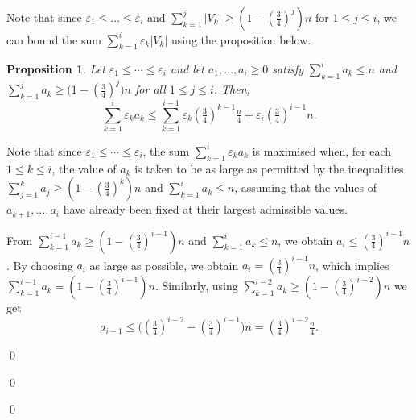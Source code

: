 \documentclass[10pt]{article}
\theoremstyle{plain}
\numberwithin{theorem}{section}
\newtheorem{prop}[theorem]{Proposition}
\theoremstyle{definition}
\theoremstyle{remark}
\renewenvironment{proof}[1][]{\begin{trivlist}
\item[\hspace{\labelsep}{\bf\noindent Proof#1.\/}] }{\qed\end{trivlist}}
\newcommand{\eps}{\varepsilon}
\theoremstyle{plain}
\begin{document}
\begin{proof}[ of \Cref{lem:expandercoverweak}]
\begin{proof}[ of claim]
Note that since $\eps_1 \le \ldots \le \eps_i$ and $\sum_{k = 1}^j |V_k| \ge (1 - \left(\frac{3}{4}\right)^j)n$ for $1 \le j \le i$, we can bound the sum $\sum_{k=1}^i \eps_k|V_k|$ using the proposition below. 

\begin{prop}\label{prop:weighted-sum-bound}
Let $\eps_1\le \cdots \le \eps_i$ and let $a_1,\ldots,a_i\ge 0$ satisfy $\sum_{k=1}^i a_k \le n$ and
$\sum_{k=1}^j a_k \ge \big(1-(\tfrac34)^j\big)n$ for all $1\le j\le i$.
Then,
\[
\sum_{k=1}^i \eps_k a_k
\le
\sum_{k=1}^{i-1}
\eps_k(\tfrac34)^{k-1}\tfrac n4
+\eps_i(\tfrac34)^{i-1}n .
\]
\end{prop}

\begin{proof}
Note that since $\eps_1\le\cdots\le\eps_i$, the sum 
$\sum_{k=1}^i \eps_k a_k$ 
is maximised when, for each $1\le k\le i$, the value of $a_k$ is taken to be as large 
as permitted by the inequalities 
$\sum_{j=1}^k a_j \ge (1-(\tfrac34)^k)n$ and $\sum_{k=1}^ia_k \le n$, 
assuming that the values of $a_{k+1},\ldots,a_i$ have already been fixed at their 
largest admissible values.

From $\sum_{k=1}^{i-1} a_k \ge (1-(\tfrac34)^{i-1})n$ and $\sum_{k=1}^i a_k \le n$, we obtain
$a_i \le (\tfrac34)^{i-1}n$. By choosing $a_i$ as large as possible, we obtain $a_i = (\tfrac34)^{i-1}n$, which implies $\sum_{k=1}^{i-1}a_k = (1 - (\tfrac34)^{i-1})n$.
Similarly, using
$\sum_{k=1}^{i-2} a_k \ge (1-(\tfrac34)^{i-2})n$ we get
\[
a_{i-1}
\le
\big((\tfrac34)^{i-2}-(\tfrac34)^{i-1}\big)n
=
(\tfrac34)^{i-2}\tfrac n4 .
\]


\end{proof}
\end{proof}
\end{proof}
\end{document}
